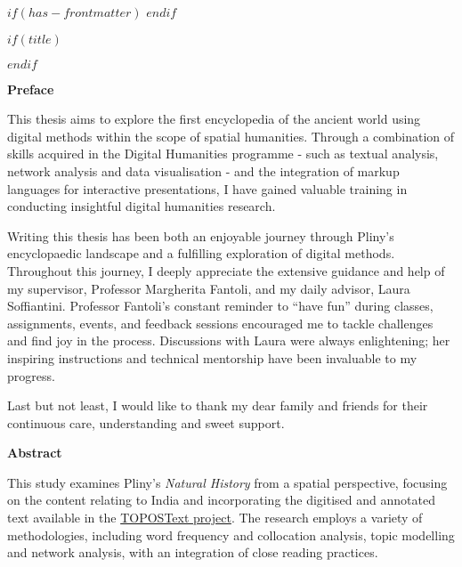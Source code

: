 $if(has-frontmatter)$
\frontmatter
$endif$

$if(title)$
\maketitle
\thispagestyle{empty}
$endif$

\newpage

\setlength{\parskip}{12pt}

\raggedright

\Large\textbf{Preface}   

\vspace*{\baselineskip}
\normalsize
\justifying
This thesis aims to explore the first encyclopedia of the ancient world using digital methods within the scope of spatial humanities. Through a combination of skills acquired in the Digital Humanities programme - such as textual analysis, network analysis and data visualisation - and the integration of markup languages for interactive presentations, I have gained valuable training in conducting insightful digital humanities research.

Writing this thesis has been both an enjoyable journey through Pliny's encyclopaedic landscape and a fulfilling exploration of digital methods. Throughout this journey, I deeply appreciate the extensive guidance and help of my supervisor, Professor Margherita Fantoli, and my daily advisor, Laura Soffiantini. Professor Fantoli's constant reminder to ``have fun'' during classes, assignments, events, and feedback sessions encouraged me to tackle challenges and find joy in the process. Discussions with Laura were always enlightening; her inspiring instructions and technical mentorship have been invaluable to my progress.

Last but not least, I would like to thank my dear family and friends for their continuous care, understanding and sweet support.

\newpage



\raggedright

\Large\textbf{Abstract}   

\vspace*{\baselineskip}
\normalsize
\justifying
This study examines Pliny's \textit{Natural History} from a spatial perspective, focusing on the content relating to India and incorporating the digitised and annotated text available in the \href{https://topostext.org/}{TOPOSText project}. The research employs a variety of methodologies, including word frequency and collocation analysis, topic modelling and network analysis, with an integration of close reading practices.
      
